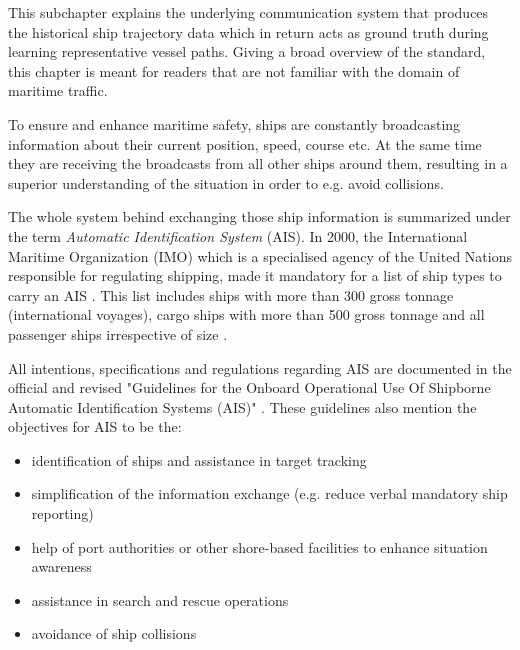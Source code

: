 This subchapter explains the underlying communication system that produces the historical ship trajectory data which in return acts as ground truth during learning representative vessel paths. Giving a broad overview of the standard, this chapter is meant for readers that are not familiar with the domain of maritime traffic.
\par
To ensure and enhance maritime safety, ships are constantly broadcasting information about their current position, speed, course etc. At the same time they are receiving the broadcasts from all other ships around them, resulting in a superior understanding of the situation in order to e.g. avoid collisions. 
\par
The whole system behind exchanging those ship information is summarized under the term \textit{Automatic Identification System} (AIS). In 2000, the International Maritime Organization (IMO) which is a specialised agency of the United Nations responsible for regulating shipping, made it mandatory for a list of ship types to carry an AIS \cite[]{imo}. This list includes ships 
with more than 300 gross tonnage (international voyages), cargo ships with more than 500 gross tonnage and all passenger ships irrespective of size \cite[]{imo}.
\par
All intentions, specifications and regulations regarding AIS are documented in the official and revised "Guidelines for the Onboard Operational Use Of
Shipborne Automatic Identification Systems (AIS)" \cite[]{international2015revised}. These guidelines also mention the objectives for AIS to be the:
\begin{itemize}
    \item identification of ships and assistance in target tracking
    \item simplification of the information exchange (e.g. reduce verbal mandatory ship reporting)
    \item help of port authorities or other shore-based facilities to enhance situation awareness
    \item assistance in search and rescue operations
    \item avoidance of ship collisions
\end{itemize}

